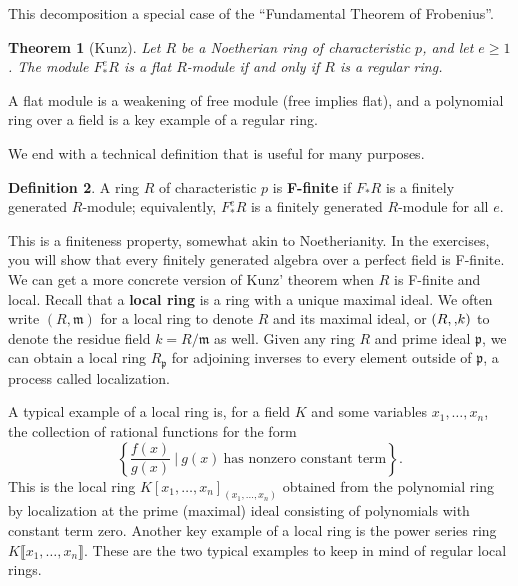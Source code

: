 \documentclass[12pt]{amsart}
\newtheorem{theorem}{Theorem}[section]
\theoremstyle{definition}
\newtheorem{definition}[theorem]{Definition}
\numberwithin{equation}{theorem}
\def\frakm{\mathfrak{m}}
\def\frakp{\mathfrak{p}}
\begin{document}
This decomposition a special case of the ``Fundamental Theorem of Frobenius''. 
\begin{theorem}[Kunz]
Let $R$ be a Noetherian ring of characteristic $p$, and let $e\geq 1$. The module $F^e_* R$ is a flat $R$-module if and only if $R$ is a regular ring.
\end{theorem}

A flat module is a weakening of free module (free implies flat), and a polynomial ring over a field is a key example of a regular ring.  


We end with a technical definition that is useful for many purposes.

\begin{definition} A ring $R$ of characteristic $p$ is \textbf{F-finite} if $F_*R$ is a finitely generated $R$-module; equivalently, $F^e_*R$ is a finitely generated $R$-module for all $e$.
\end{definition}

This is a finiteness property, somewhat akin to Noetherianity. In the exercises, you will show that every finitely generated algebra over a perfect field is F-finite. We can get a more concrete version of Kunz' theorem when $R$ is F-finite and local. Recall that a \textbf{local ring} is a ring with a unique maximal ideal. We often write $(R,\frakm)$ for a local ring to denote $R$ and its maximal ideal, or $(R,\frak,k)$ to denote the residue field $k=R/\frakm$ as well. Given any ring $R$ and prime ideal $\frakp$, we can obtain a local ring $R_\frakp$ for adjoining inverses to every element outside of $\frakp$, a process called localization. 

A typical example of a local ring is, for a field $K$ and some variables $x_1,\dots,x_n$, the collection of rational functions for the form 
\[ \left\{ \frac{f(x)}{g(x)} \ \big| \ g(x) \ \text{has nonzero constant term}\right\}.\]
This is the local ring $K[x_1,\dots,x_n]_{(x_1,\dots,x_n)}$ obtained from the polynomial ring by localization at the prime (maximal) ideal consisting of polynomials with constant term zero. Another key example of a local ring  is the power series ring $K\llbracket x_1,\dots,x_n \rrbracket$. These are the two typical examples to keep in mind of regular local rings.
\end{document}
